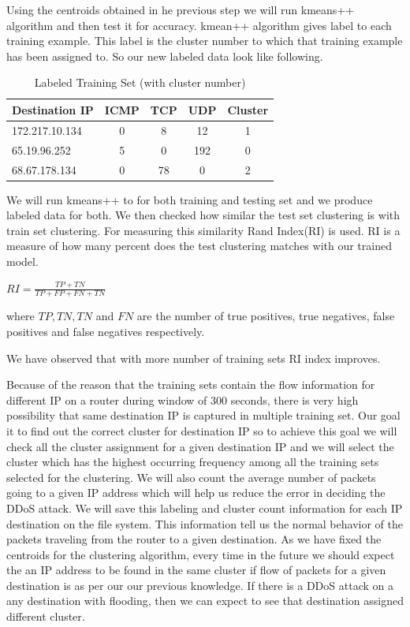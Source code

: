 \documentclass[10pt,oneside,a4paper]{article}
\begin{document}
Using the centroids obtained in he previous step we will run kmeans++ algorithm and then test it for accuracy. kmean++ algorithm gives label to each training example. This label is the cluster number to which that training example has been assigned to. So our new labeled data look like following.

\begin{table}[H]
\centering
  \begin{tabular}{| l | c | c | c | c |}
    \hline
    {Destination IP}  &ICMP  &TCP &UDP  &Cluster \\
    \hline
    172.217.10.134  & 0     & 8     & 12  &1  \\ \hline
    65.19.96.252    & 5     & 0     & 192 &0  \\ \hline
    68.67.178.134   & 0     & 78    & 0   &2  \\ \hline
  \end{tabular}
\caption{Labeled Training Set (with cluster number)} \label{table:labeled-set}
\end{table}


We will run kmeans++ to for both training and testing set and we produce labeled data for both. We then checked how similar the test set clustering is with train set clustering. For measuring this similarity Rand Index(RI)\cite{ri-index} is used. RI is a measure of how many percent does the test clustering matches with our trained model.

\hspace{4cm} $RI={\frac {TP+TN}{TP+FP+FN+TN}}$

where $TP, TN, TN$ and $FN$ are the number of true positives, true negatives, false positives and false negatives respectively.

We have observed that with more number of training sets RI index improves.

Because of the reason that the training sets contain the flow information for different IP on a router during window of 300 seconds, there is very high possibility that same destination IP is captured in multiple training set. Our goal it to find out the correct cluster for destination IP so to achieve this goal we will check all the cluster assignment for a given destination IP and we will select the cluster which has the highest occurring frequency among all the training sets selected for the clustering. We will also count the average number of packets going to a given IP address which will help us reduce the error in deciding the DDoS attack. We will save this labeling and cluster count information for each IP destination on the file system. This information tell us the normal behavior of the packets traveling from the router to a given destination. As we have fixed the centroids for the clustering algorithm, every time in the future we should expect the an IP address to be found in the same cluster if flow of packets for a given destination is as per our our previous knowledge. If there is a DDoS attack on a any destination with flooding, then we can expect to see that destination assigned different cluster.
\end{document}
